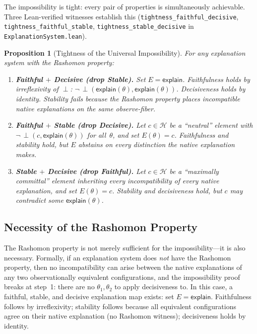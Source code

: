 \documentclass{article}
\newtheorem{proposition}{Proposition}
\newcommand{\sH}{\mathcal{H}}
\newcommand{\incomp}{\perp}                  %
\begin{document}
The impossibility is tight: every pair of properties is simultaneously
achievable.  Three Lean-verified witnesses establish this
(\texttt{tightness\_faithful\_decisive},
\texttt{tightness\_faithful\_stable},
\texttt{tightness\_stable\_decisive} in \texttt{ExplanationSystem.lean}).

\begin{proposition}[Tightness of the Universal Impossibility]
\label{prop:tightness}
For any explanation system with the Rashomon property:
\begin{enumerate}
  \item \textbf{Faithful $+$ Decisive (drop Stable).}
    Set $E = \mathsf{explain}$.  Faithfulness holds by irreflexivity of
    $\incomp$: $\neg\,\incomp(\mathsf{explain}(\theta), \mathsf{explain}(\theta))$.
    Decisiveness holds by identity.  Stability fails because the Rashomon
    property places incompatible native explanations on the same observe-fiber.

  \item \textbf{Faithful $+$ Stable (drop Decisive).}
    Let $c \in \sH$ be a ``neutral'' element with
    $\neg\,\incomp(c, \mathsf{explain}(\theta))$ for all~$\theta$, and set
    $E(\theta) = c$.  Faithfulness and stability hold, but $E$ abstains on
    every distinction the native explanation makes.

  \item \textbf{Stable $+$ Decisive (drop Faithful).}
    Let $c \in \sH$ be a ``maximally committal'' element inheriting every
    incompatibility of every native explanation, and set $E(\theta) = c$.
    Stability and decisiveness hold, but $c$ may contradict some
    $\mathsf{explain}(\theta)$.
\end{enumerate}
\end{proposition}

\subsection{Necessity of the Rashomon Property}
\label{sec:necessity}

The Rashomon property is not merely sufficient for the impossibility---it is
also necessary.  Formally, if an explanation system does \emph{not} have the
Rashomon property, then no incompatibility can arise between the native
explanations of any two observationally equivalent configurations, and the
impossibility proof breaks at step~1: there are no $\theta_1, \theta_2$ to
apply decisiveness to.  In this case, a faithful, stable, and decisive
explanation map exists: set $E = \mathsf{explain}$.  Faithfulness follows by
irreflexivity; stability follows because all equivalent configurations agree
on their native explanation (no Rashomon witness); decisiveness holds by
identity.
\end{document}
